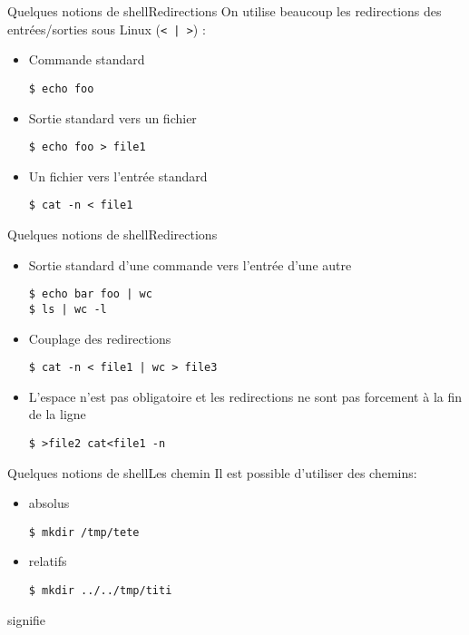 \begin{frame}[fragile=singleslide]{Quelques notions de shell}{Redirections}
  On utilise beaucoup les  redirections des entrées/sorties sous Linux
  (\verb+< | >+) :
  \begin{itemize}
  \item Commande standard
\begin{lstlisting}
$ echo foo
\end{lstlisting}
  \item Sortie standard vers un fichier
\begin{lstlisting}
$ echo foo > file1
\end{lstlisting}
  \item Un fichier vers l'entrée standard
\begin{lstlisting}
$ cat -n < file1
\end{lstlisting} %
  \end{itemize}
\end{frame}

\begin{frame}[fragile=singleslide]{Quelques notions de shell}{Redirections}
  \begin{itemize}
  \item Sortie standard d'une commande vers l'entrée d'une autre
\begin{lstlisting}
$ echo bar foo | wc
$ ls | wc -l
\end{lstlisting}
  \item Couplage des redirections
\begin{lstlisting}
$ cat -n < file1 | wc > file3
\end{lstlisting} %
  \item L'espace n'est pas obligatoire et les redirections ne sont pas
    forcement à la fin de la ligne
\begin{lstlisting}
$ >file2 cat<file1 -n
\end{lstlisting} %
  \end{itemize}
\end{frame}

\begin{frame}[fragile=singleslide]{Quelques notions de shell}{Les chemin}
  Il est possible d'utiliser des chemins:
  \begin{itemize}
  \item absolus
\begin{lstlisting}
$ mkdir /tmp/tete
\end{lstlisting}
  \item relatifs
\begin{lstlisting}
$ mkdir ../../tmp/titi
\end{lstlisting}
  \end{itemize}
   signifie 
\end{frame}

